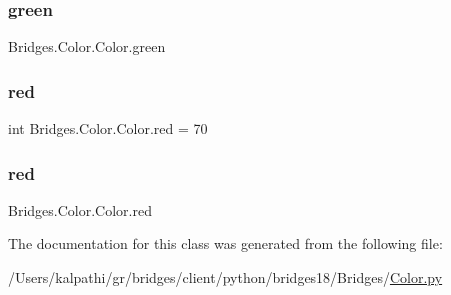 \subsubsection{\texorpdfstring{green}{green}\hspace{0.1cm}{\footnotesize\ttfamily [2/2]}}
{\footnotesize\ttfamily Bridges.\+Color.\+Color.\+green}

\mbox{\label{class_bridges_1_1_color_1_1_color_aa2f8facc108ecf452c834b76e5462c34}} 
\subsubsection{\texorpdfstring{red}{red}\hspace{0.1cm}{\footnotesize\ttfamily [1/2]}}
{\footnotesize\ttfamily int Bridges.\+Color.\+Color.\+red = 70\hspace{0.3cm}{\ttfamily [static]}}

\mbox{\label{class_bridges_1_1_color_1_1_color_a51436cc5661d40acb09332e7bc9a13b7}} 
\subsubsection{\texorpdfstring{red}{red}\hspace{0.1cm}{\footnotesize\ttfamily [2/2]}}
{\footnotesize\ttfamily Bridges.\+Color.\+Color.\+red}



The documentation for this class was generated from the following file\+:\begin{DoxyCompactItemize}
\item 
/\+Users/kalpathi/gr/bridges/client/python/bridges18/\+Bridges/\mbox{\hyperlink{_color_8py}{Color.\+py}}\end{DoxyCompactItemize}
